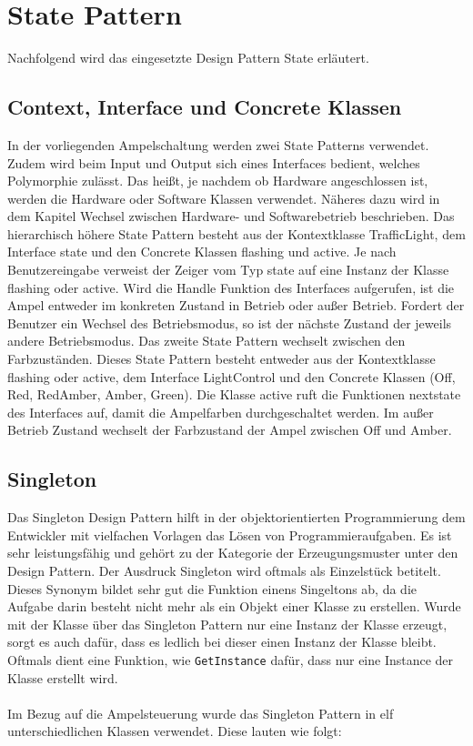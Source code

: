 \chapter{State Pattern}
Nachfolgend wird das eingesetzte Design Pattern State erläutert.
\section{Context, Interface und Concrete Klassen}
In der vorliegenden Ampelschaltung werden zwei State Patterns verwendet. Zudem wird beim Input und Output sich eines Interfaces bedient, welches Polymorphie zulässt. Das heißt, je nachdem ob Hardware angeschlossen ist, werden die Hardware oder Software Klassen verwendet. Näheres dazu wird in dem Kapitel \glqq Wechsel zwischen Hardware- und Softwarebetrieb\grqq{} beschrieben. Das hierarchisch höhere State Pattern besteht aus der Kontextklasse \glqq TrafficLight\grqq{}, dem Interface \glqq state\grqq{} und den Concrete Klassen \glqq flashing\grqq{} und \glqq active\grqq{}. Je nach Benutzereingabe verweist der Zeiger vom Typ \glqq state\grqq{} auf eine Instanz der Klasse \glqq flashing\grqq{} oder \glqq active\grqq{}. Wird die Handle Funktion des Interfaces aufgerufen, ist die Ampel entweder im konkreten Zustand \glqq in Betrieb\grqq{} oder \glqq außer Betrieb\grqq{}. Fordert der Benutzer ein Wechsel des Betriebsmodus, so ist der nächste Zustand der jeweils andere Betriebsmodus. Das zweite State Pattern wechselt zwischen den Farbzuständen. Dieses State Pattern besteht entweder aus der Kontextklasse \glqq flashing\grqq{} oder \glqq active\grqq{}, dem Interface \glqq LightControl\grqq{} und den Concrete Klassen (\glqq Off\grqq{}, \glqq Red\grqq{}, \glqq RedAmber\grqq{}, \glqq Amber\grqq{},  \glqq Green\grqq{}). Die Klasse  \glqq active\grqq{} ruft die Funktionen \glqq nextstate\grqq{} des Interfaces auf, damit die Ampelfarben durchgeschaltet werden. Im außer Betrieb Zustand wechselt der Farbzustand der Ampel zwischen Off und Amber.

\section{Singleton}
Das Singleton Design Pattern hilft in der objektorientierten Programmierung dem Entwickler mit vielfachen Vorlagen das Lösen von Programmieraufgaben. Es ist sehr leistungsfähig und gehört zu der Kategorie der Erzeugungsmuster unter den Design Pattern. Der Ausdruck Singleton wird oftmals als \glqq Einzelstück\grqq{} betitelt. Dieses Synonym bildet sehr gut die Funktion einens Singeltons ab, da die Aufgabe darin besteht nicht mehr als ein Objekt einer Klasse zu erstellen. Wurde mit der Klasse über das Singleton Pattern nur eine Instanz der Klasse erzeugt, sorgt es auch dafür, dass es ledlich bei dieser einen Instanz der Klasse bleibt. Oftmals dient eine Funktion, wie \texttt{GetInstance} dafür, dass nur eine Instance der Klasse erstellt wird.\\
\\
Im Bezug auf die Ampelsteuerung wurde das Singleton Pattern in elf unterschiedlichen Klassen verwendet. Diese lauten wie folgt:

